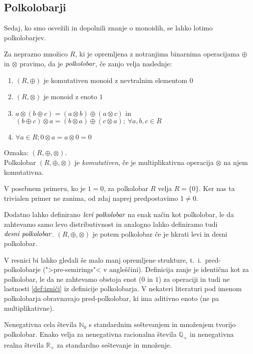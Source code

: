 \documentclass[mat1]{fmfdelo}
\newcommand{\N}{\mathbb{N}}
\newcommand{\No}{\N_0}
\newcommand{\Pplus}[1]{\mathbb{#1}_{+}}
\newcommand{\pojem}[1]{\ensuremath{\emph{#1}}}
\begin{document}
\subsection{Polkolobarji}
Sedaj, ko smo osvežili in dopolnili znanje o monoidih, se lahko lotimo polkolobarjev.
\begin{definicija}
	Za neprazno množico $R$, ki je opremljena z notranjima binarnima operacijama $\oplus$ in $\otimes$ pravimo, da je \pojem{polkolobar}, če zanjo velja naslednje:
	\begin{enumerate}
		\item $(R, \oplus)$ je komutativen monoid z nevtralnim elementom $0$
		\item $(R, \otimes)$ je monoid z enoto $1$
		\item $a\otimes(b \oplus c) = (a\otimes b) \oplus (a\otimes c)$ in $(b \oplus c)\otimes a = (b\otimes a) \oplus (c\otimes a);~\forall a, b, c\in R$
		\item  \label{def:izniči} $\forall a\in R; 0 \otimes a = a\otimes 0 = 0$
	\end{enumerate}
	Oznaka: $(R, \oplus, \otimes)$. \\ Polkolobar $(R, \oplus, \otimes)$ je \textit{komutativen}, če je multiplikativna operacija $\otimes$ na njem komutativna.
\end{definicija}
V posebnem primeru, ko je $1 = 0$, za polkolobar $R$ velja $R = \{0\}$. Ker nas ta trivialen primer ne zanima, od zdaj naprej predpostavimo $1 \neq 0$.
\begin{opomba}
	Dodatno lahko definirano \pojem{levi polkolobar} na enak način kot polkolobar, le da zahtevamo samo levo distributivnost in analogno lahko definiramo tudi \pojem{desni polkolobar}. $(R,\oplus, \otimes)$ je potem polkolobar če je hkrati levi in desni polkolobar.
\end{opomba}
\begin{opomba}
	V resnici bi lahko gledali še malo manj opremljene strukture, t.~i.~pred-polkolobarje (">pre-semirings"< v angleščini). Definicija zanje je identična kot za polkolobar, le da ne zahtevamo obstoja enot ($0$ in $1$) za operaciji in tudi ne lastnosti \ref{def:izniči} iz definicije polkolobarja. V nekateri literaturi pod imenom polkolobarja obravnavajo pred-polkolobar, ki ima aditivno enoto (ne pa multiplikativne).
\end{opomba}
\begin{zgled}
	Nenegativna cela števila $\No$ s standardnim seštevanjem in množenjem tvorijo polkolobar. Enako velja za nenegativna racionalna števila $\Pplus{Q}$ in nenegativna realna števila $\Pplus{R}$ za standardno seštevanje in množenje.
\end{zgled}
\end{document}
